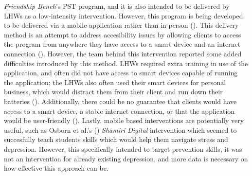 \documentclass[stu,a4paper,12pt,donotrepeattitle]{apa7}
\begin{document}
\textit{Friendship Bench}'s PST program, and it is also intended to be
delivered by LHWs as a low-intensity intervention. However, this program is
being developed to be delivered via a mobile application rather than in-person
(\cite{douketal21}). This delivery method is an attempt to address accesibility
issues by allowing clients to access the program from anywhere they have access
to a smart device and an internet connection (\cite{douketal21}). However, the
team behind this intervention reported some added difficulties introduced by
this method. LHWs required extra training in use of the application, and often
did not have access to smart devices capable of running the application; the
LHWs also often used their smart devices for personal business, which would
distract them from their client and run down their batteries
(\cite{douketal21}). Additionally, there could be no guarantee that clients
would have access to a smart device, a stable internet connection, or that
the application would be user-friendly (\cite{douketal21}). Lastly, mobile
based interventions are potentially very useful, such as Osborn et al.'s
(\citeyear{Osetal20}) \textit{Shamiri-Digital} intervention which seemed to
succesfully teach students skills which would help them navigate stress and
depression. However, this specifically intended to target prevention skills, it
was not an intervention for already existing depression, and more data is
necessary on how effective this approach can be.
\end{document}
